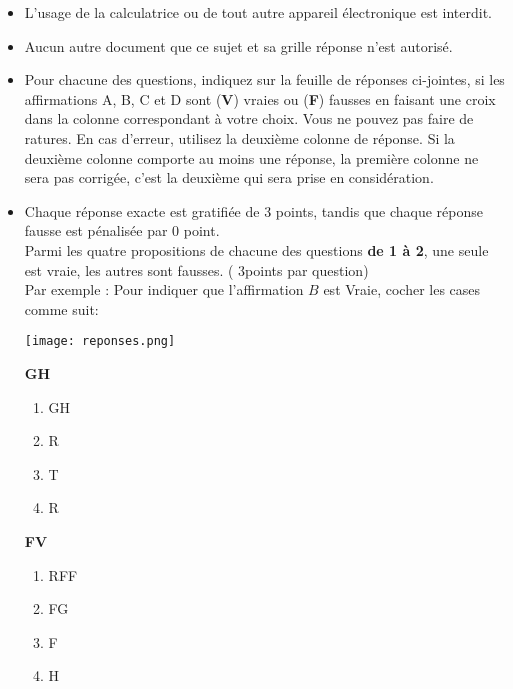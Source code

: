 \documentclass{book}%
\begin{document}
\begin{itemize}%
\item%
L'usage de la calculatrice ou de tout autre appareil électronique est interdit.%
\item%
Aucun autre document que ce sujet et sa grille réponse n'est autorisé.%
\item%
Pour chacune des questions, indiquez sur la feuille de réponses ci-jointes, si les affirmations A, B, C et D sont (\textbf{V}) vraies ou (\textbf{F}) fausses en faisant une croix dans la colonne correspondant à votre choix. Vous ne pouvez pas faire de ratures. En cas d'erreur, utilisez la deuxième colonne de réponse. Si la deuxième colonne comporte au moins une réponse, la première colonne ne sera pas corrigée, c'est la deuxième qui sera prise en considération.%
\item%
Chaque réponse exacte est gratifiée de 3 points, tandis que chaque réponse fausse est pénalisée par 0 point. \\ 	Parmi les quatre propositions de chacune des questions \textbf{de 1 à 2}, une seule est vraie, les autres sont fausses. ( 3points par question) \\ 	Par exemple : Pour indiquer que l'affirmation $B$ est Vraie, cocher les cases comme suit:  \\ \begin{center}	\texttt{[image: reponses.png]} \end{center}%
\begin{exercise}%
\textbf{GH }%
\begin{enumerate}[label=\textbf{\Alph*. }]%
\item%
GH%
\item%
R%
\item%
T%
\item%
R%
\end{enumerate}%
\end{exercise}%
\begin{exercise}%
\textbf{FV }%
\begin{enumerate}[label=\textbf{\Alph*. }]%
\item%
RFF%
\item%
FG%
\item%
F%
\item%
H%
\end{enumerate}%
\end{exercise}%
\end{itemize}%
\end{document}
